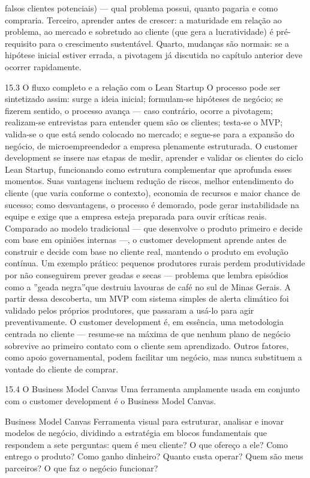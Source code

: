 falsos clientes potenciais) — qual problema possui, quanto pagaria e como compraria. Terceiro, aprender antes de crescer: a maturidade em relação ao problema, ao mercado e sobretudo ao cliente (que gera a lucratividade) é pré-requisito para o crescimento sustentável. Quarto, mudanças são normais: se a hipótese inicial estiver errada, a pivotagem já discutida no capítulo anterior deve ocorrer rapidamente.

15.3 O fluxo completo e a relação com o Lean Startup O processo pode ser sintetizado assim: surge a ideia inicial; formulam-se hipóteses de negócio; se fizerem sentido, o processo avança — caso contrário, ocorre a pivotagem; realizam-se entrevistas para entender quem são os clientes; testa-se o MVP; valida-se o que está sendo colocado no mercado; e segue-se para a expansão do negócio, de microempreendedor a empresa plenamente estruturada. O customer development se insere nas etapas de medir, aprender e validar os clientes do ciclo Lean Startup, funcionando como estrutura complementar que aprofunda esses momentos. Suas vantagens incluem redução de riscos, melhor entendimento do cliente (que varia conforme o contexto), economia de recursos e maior chance de sucesso; como desvantagens, o processo é demorado, pode gerar instabilidade na equipe e exige que a empresa esteja preparada para ouvir críticas reais. Comparado ao modelo tradicional — que desenvolve o produto primeiro e decide com base em opiniões internas —, o customer development aprende antes de construir e decide com base no cliente real, mantendo o produto em evolução contínua. Um exemplo prático: pequenos produtores rurais perdem produtividade por não conseguirem prever geadas e secas — problema que lembra episódios como a ”geada negra”que destruiu lavouras de café no sul de Minas Gerais. A partir dessa descoberta, um MVP com sistema simples de alerta climático foi validado pelos próprios produtores, que passaram a usá-lo para agir preventivamente. O customer development é, em essência, uma metodologia centrada no cliente — resume-se na máxima de que nenhum plano de negócio sobrevive ao primeiro contato com o cliente sem aprendizado. Outros fatores, como apoio governamental, podem facilitar um negócio, mas nunca substituem a vontade do cliente de comprar.

15.4 O Business Model Canvas Uma ferramenta amplamente usada em conjunto com o customer development é o Business Model Canvas.

Business Model Canvas Ferramenta visual para estruturar, analisar e inovar modelos de negócio, dividindo a estratégia em blocos fundamentais que respondem a sete perguntas: quem é meu cliente? O que ofereço a ele? Como entrego o produto? Como ganho dinheiro? Quanto custa operar? Quem são meus parceiros? O que faz o negócio funcionar?

